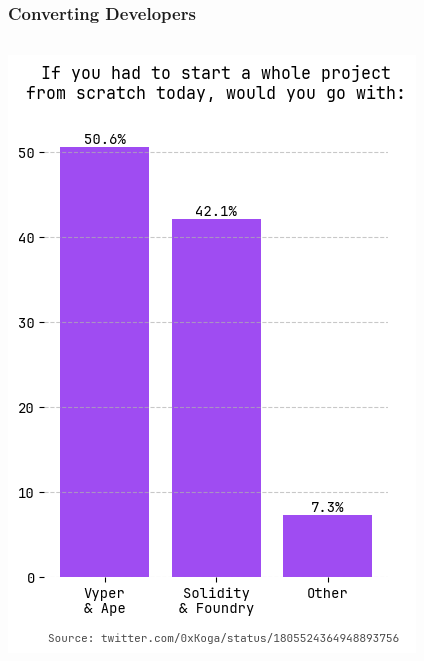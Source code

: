 \documentclass[aspectratio=169]{beamer}
\begin{document}
	\begin{frame}
	\frametitle{Converting Developers}
	\begin{columns}[T,totalwidth=\textwidth]
		\begin{column}{0.35\textwidth}
			\vspace{2em} %
			\includegraphics[width=\columnwidth,height=0.75\paperheight,keepaspectratio]{charts/preference.png}
		\end{column}
		\begin{column}{0.65\textwidth}
			\vspace{2em} %
			\begin{itemize}

\end{itemize}
\end{column}
\end{columns}
\end{frame}
\end{document}
